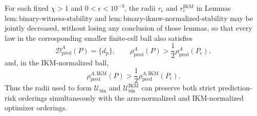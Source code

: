 For each fixed \(\chi>1\) and \(0<\epsilon<10^{-3}\), the radii \(r_\epsilon\) and \(r_\epsilon^{\mathrm{IKM}}\) in Lemmas~\(\mathrm{lem{:}binary\text{-}witness\text{-}stability}\) and \(\mathrm{lem{:}binary\text{-}ikmw\text{-}normalized\text{-}stability}\) may be jointly decreased, without losing any conclusion of those lemmas, so that every law in the corresponding smaller finite-cell ball also satisfies
\[
 \mathcal D_{\mathrm{pred}}^A(P)=\{d_{\mathrm p}\},
 \qquad
 \rho_{\mathrm{pred}}^A(P)>\frac12\rho_{\mathrm{pred}}^A(P_\epsilon),
\]
and, in the IKM-normalized ball,
\[
 \rho_{\mathrm{pred}}^{A,\mathrm{IKM}}(P)
 >\frac12\rho_{\mathrm{pred}}^{A,\mathrm{IKM}}(P_\epsilon).
\]
Thus the radii used to form \(\mathcal U_{\mathrm{bin}}\) and \(\mathcal U_{\mathrm{bin}}^{\mathrm{IKM}}\) can preserve both strict prediction-risk orderings simultaneously with the arm-normalized and IKM-normalized optimizer orderings.